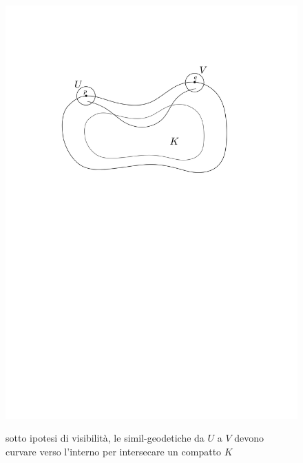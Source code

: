 \begin{figure}[h!]
    \begin{center}
        \includegraphics[width=1.05\textwidth, trim=0 18cm 0 5cm]{Immagini/vis2.png} \\
        \caption{sotto ipotesi di visibilità, le simil-geodetiche da $U$ a $V$ devono curvare verso l'interno per intersecare un compatto $K$}
    \end{center}
\end{figure}

